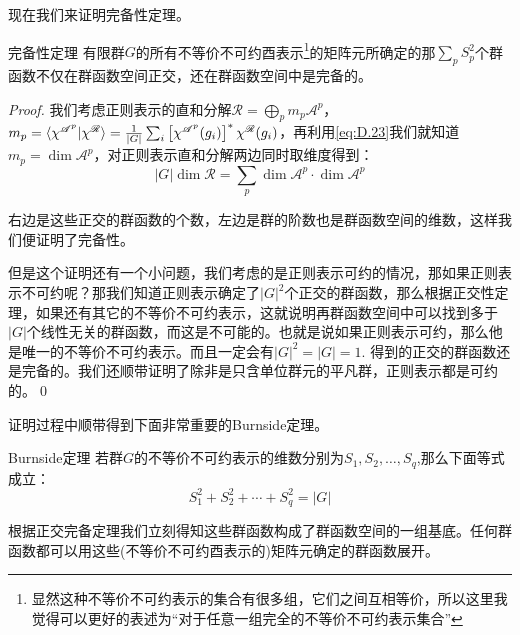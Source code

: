 现在我们来证明完备性定理。
\begin{theorem}{完备性定理}
	有限群$G$的所有不等价不可约酉表示\footnote{显然这种不等价不可约表示的集合有很多组，它们之间互相等价，所以这里我觉得可以更好的表述为“对于任意一组完全的不等价不可约表示集合”}的矩阵元所确定的那$\sum_{p}S^2_p$个群函数不仅在群函数空间正交，还在群函数空间中是完备的。
\end{theorem}
\begin{proof}
	我们考虑正则表示的直和分解$\mathscr{R}=\bigoplus\limits_{p}m_p\mathscr{A}^p$，$m_p=\braket{\chi^{\mathscr{A}^p}|\chi^{\mathscr{R}}}=\frac{1}{|G|}\sum_i\left[\chi^{\mathscr{A}^p}(g_i)\right]^*\chi^{\mathscr{R}}(g_i)$，再利用\ref{eq:D.23}我们就知道$m_p=\dim \mathscr{A}^p$，对正则表示直和分解两边同时取维度得到：
	\[|G|\dim \mathscr{R}=\sum_p\dim \mathscr{A}^p\cdot\dim \mathscr{A}^p\]
	
	右边是这些正交的群函数的个数，左边是群的阶数也是群函数空间的维数，这样我们便证明了完备性。
	
	但是这个证明还有一个小问题，我们考虑的是正则表示可约的情况，那如果正则表示不可约呢？那我们知道正则表示确定了$|G|^2$个正交的群函数，那么根据正交性定理，如果还有其它的不等价不可约表示，这就说明再群函数空间中可以找到多于$|G|$个线性无关的群函数，而这是不可能的。也就是说如果正则表示可约，那么他是唯一的不等价不可约表示。而且一定会有$|G|^2=|G|=1$. 得到的正交的群函数还是完备的。我们还顺带证明了除非是只含单位群元的平凡群，正则表示都是可约的。\qed
\end{proof}

证明过程中顺带得到下面非常重要的Burnside定理。
\begin{theorem}{Burnside定理}
	若群$G$的不等价不可约表示的维数分别为$S_1,S_2,\ldots,S_q$,那么下面等式成立：
	\begin{equation}
		\boxed{
			S^2_1+S^2_2+\cdots+S^2_q=|G|
	}
	\end{equation}
\end{theorem}
根据正交完备定理我们立刻得知这些群函数构成了群函数空间的一组基底。任何群函数都可以用这些(不等价不可约酉表示的)矩阵元确定的群函数展开。

